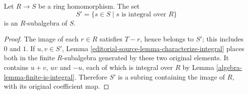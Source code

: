 \begin{lemma}
\label{editorial-source-lemma-integral-closure-is-ring}
Let $R \to S$ be a ring homomorphism.
The set
$$
S' = \{s \in S \mid s\text{ is integral over }R\}
$$
is an $R$-subalgebra of $S$.
\end{lemma}

\begin{proof}
The image of each $r\in R$ satisfies $T-r$, hence belongs to $S'$;
this includes $0$ and $1$. If $u,v\in S'$,
Lemma \ref{editorial-source-lemma-characterize-integral} places both in the finite
$R$-subalgebra generated by these two original elements. It contains
$u+v$, $uv$ and $-u$, each of which is integral over $R$ by
Lemma \ref{algebra-lemma-finite-is-integral}. Therefore $S'$ is a subring
containing the image of $R$, with its original coefficient map.
\end{proof}